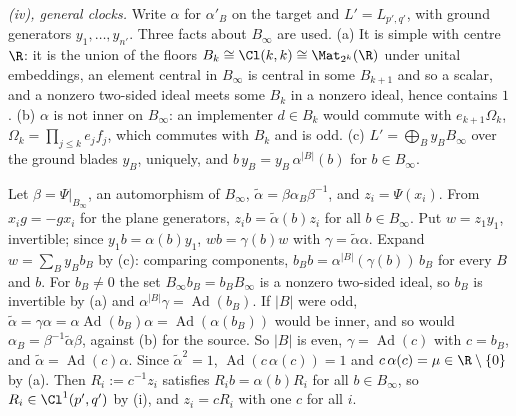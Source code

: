 \emph{(iv), general clocks.} Write $\alpha$ for $\alpha'_{B}$ on the target and $L' = L_{p',q'}$, with ground generators $y_{1}, \dots, y_{n'}$. Three facts about $B_{\infty}$ are used. (a) It is simple with centre $\R$: it is the union of the floors $B_{k} \cong \Cl(k,k) \cong \Mat_{2^{k}}(\R)$ under unital embeddings, an element central in $B_{\infty}$ is central in some $B_{k+1}$ and so a scalar, and a nonzero two-sided ideal meets some $B_{k}$ in a nonzero ideal, hence contains $1$. (b) $\alpha$ is not inner on $B_{\infty}$: an implementer $d \in B_{k}$ would commute with $e_{k+1}\Omega_{k}$, $\Omega_{k} = \prod_{j \le k}e_{j}f_{j}$, which commutes with $B_{k}$ and is odd. (c) $L' = \bigoplus_{B}y_{B}B_{\infty}$ over the ground blades $y_{B}$, uniquely, and $b\,y_{B} = y_{B}\,\alpha^{|B|}(b)$ for $b \in B_{\infty}$.

Let $\beta = \Psi|_{B_{\infty}}$, an automorphism of $B_{\infty}$, $\tilde\alpha = \beta\alpha_{B}\beta^{-1}$, and $z_{i} = \Psi(x_{i})$. From $x_{i}g = -gx_{i}$ for the plane generators, $z_{i}b = \tilde\alpha(b)z_{i}$ for all $b \in B_{\infty}$. Put $w = z_{1}y_{1}$, invertible; since $y_{1}b = \alpha(b)y_{1}$, $wb = \gamma(b)w$ with $\gamma = \tilde\alpha\alpha$. Expand $w = \sum_{B}y_{B}b_{B}$ by (c): comparing components, $b_{B}b = \alpha^{|B|}(\gamma(b))\,b_{B}$ for every $B$ and $b$. For $b_{B} \ne 0$ the set $B_{\infty}b_{B} = b_{B}B_{\infty}$ is a nonzero two-sided ideal, so $b_{B}$ is invertible by (a) and $\alpha^{|B|}\gamma = \operatorname{Ad}(b_{B})$. If $|B|$ were odd, $\tilde\alpha = \gamma\alpha = \alpha\operatorname{Ad}(b_{B})\alpha = \operatorname{Ad}(\alpha(b_{B}))$ would be inner, and so would $\alpha_{B} = \beta^{-1}\tilde\alpha\beta$, against (b) for the source. So $|B|$ is even, $\gamma = \operatorname{Ad}(c)$ with $c = b_{B}$, and $\tilde\alpha = \operatorname{Ad}(c)\alpha$. Since $\tilde\alpha^{2} = 1$, $\operatorname{Ad}(c\,\alpha(c)) = 1$ and $c\,\alpha(c) = \mu \in \R \setminus \{0\}$ by (a). Then $R_{i} := c^{-1}z_{i}$ satisfies $R_{i}b = \alpha(b)R_{i}$ for all $b \in B_{\infty}$, so $R_{i} \in \Cl^{1}(p',q')$ by (i), and $z_{i} = cR_{i}$ with one $c$ for all $i$.

